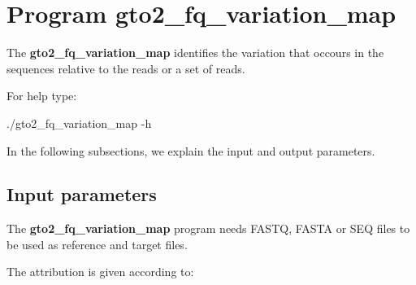 \documentclass[11pt,]{krantz}
\newenvironment{Shaded}{\begin{snugshade}}{\end{snugshade}}
\newcommand{\ExtensionTok}[1]{#1}
\newcommand{\NormalTok}[1]{#1}
\begin{document}
\section{Program
gto2\_fq\_variation\_map}\label{program-gto2_fq_variation_map}

The \textbf{gto2\_fq\_variation\_map} identifies the variation that
occours in the sequences relative to the reads or a set of reads.

For help type:

\begin{Shaded}
\begin{Highlighting}[]
\ExtensionTok{./gto2_fq_variation_map}\NormalTok{ -h}
\end{Highlighting}
\end{Shaded}

In the following subsections, we explain the input and output
parameters.

\subsection*{Input parameters}\label{input-parameters-23}


The \textbf{gto2\_fq\_variation\_map} program needs FASTQ, FASTA or SEQ
files to be used as reference and target files.

The attribution is given according to:
\end{document}
